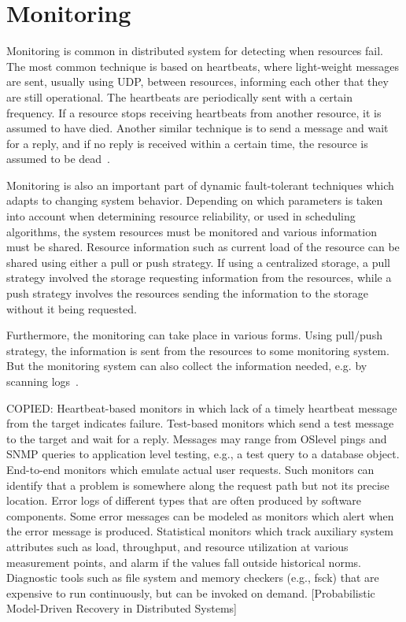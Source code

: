 \documentclass{cslthse-msc}
\begin{document}
\section{Monitoring} \label{sec:background_monitoring}
Monitoring is common in distributed system for detecting when resources fail. The most common technique is based on heartbeats, where light-weight messages are sent, usually using UDP, between resources, informing each other that they are still operational. The heartbeats are periodically sent with a certain frequency. If a resource stops receiving heartbeats from another resource, it is assumed to have died. Another similar technique is to send a message and wait for a reply, and if no reply is received within a certain time, the resource is assumed to be dead~\cite{probabilistic_recovery}.

Monitoring is also an important part of dynamic fault-tolerant techniques which adapts to changing system behavior. Depending on which parameters is taken into account when determining resource reliability, or used in scheduling algorithms, the system resources must be monitored and various information must be shared. Resource information such as current load of the resource can be shared using either a pull or push strategy. If using a centralized storage, a pull strategy involved the storage requesting information from the resources, while a push strategy involves the resources sending the information to the storage without it being requested.

Furthermore, the monitoring can take place in various forms. Using pull/push strategy, the information is sent from the resources to some monitoring system. But the monitoring system can also collect the information needed, e.g. by scanning logs~\cite{probabilistic_recovery}.

\iffalse
COPIED:
Heartbeat-based monitors in which lack of a timely heartbeat message from the target indicates failure.
Test-based monitors which send a test message to the target and wait for a reply. Messages may range from OSlevel pings and SNMP queries to application level testing, e.g., a test query to a database object.
End-to-end monitors which emulate actual user requests. Such monitors can identify that a problem is somewhere along the request path but not its precise location.
Error logs of different types that are often produced by software components. Some error messages can be modeled as monitors which alert when the error message is produced.
Statistical monitors which track auxiliary system attributes such as load, throughput, and resource utilization at various measurement points, and alarm if the values fall outside historical norms.
Diagnostic tools such as file system and memory checkers (e.g., fsck) that are expensive to run continuously, but can be invoked on demand. [Probabilistic Model-Driven Recovery in Distributed Systems]
\end{document}
